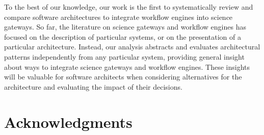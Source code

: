 \documentclass[preprint,3p,twocolumn]{elsarticle}
\begin{document}
To the best of our knowledge, our work is the first to systematically
review and compare software architectures  to integrate workflow
engines into science gateways. So far, the literature on science gateways and
workflow engines has focused on the description of particular systems,
or on the presentation of a particular architecture.  Instead, our
analysis abstracts and evaluates architectural patterns independently
from any particular system, providing general insight about ways to integrate
science gateways and workflow engines. These insights will be valuable
for software architects when considering alternatives for the architecture and evaluating the impact of their decisions.


\section{Acknowledgments}
\end{document}
